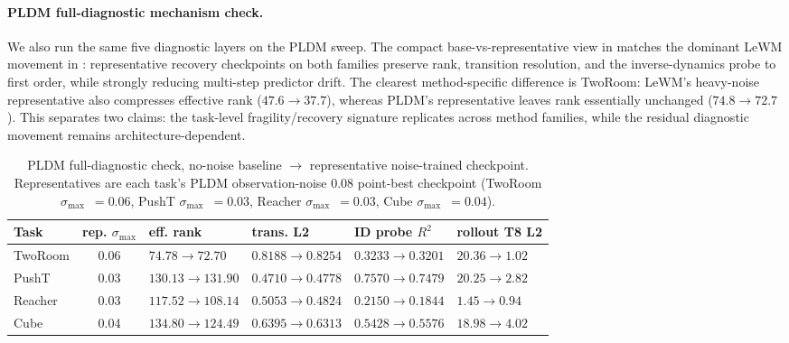 \documentclass[10pt]{article}
\newcommand{\stdmax}{\ensuremath{\sigma_{\max}}}
\begin{document}
\paragraph{PLDM full-diagnostic mechanism check.} We also run the same five diagnostic layers on the PLDM sweep. The compact base-vs-representative view in  matches the dominant LeWM movement in : representative recovery checkpoints on both families preserve rank, transition resolution, and the inverse-dynamics probe to first order, while strongly reducing multi-step predictor drift. The clearest method-specific difference is TwoRoom: LeWM's heavy-noise representative also compresses effective rank ($47.6 \to 37.7$), whereas PLDM's representative leaves rank essentially unchanged ($74.8 \to 72.7$). This separates two claims: the task-level fragility/recovery signature replicates across method families, while the residual diagnostic movement remains architecture-dependent.

\begin{table}[H]
\centering
\caption{PLDM full-diagnostic check, no-noise baseline $\to$ representative noise-trained checkpoint. Representatives are each task's PLDM observation-noise 0.08 point-best checkpoint (TwoRoom \stdmax{}~$= 0.06$, PushT \stdmax{}~$= 0.03$, Reacher \stdmax{}~$= 0.03$, Cube \stdmax{}~$= 0.04$).}
\label{tab:pldm-full-diag}
\small
\setlength{\tabcolsep}{4pt}
\begin{tabularx}{\textwidth}{l c >{\centering\arraybackslash}X >{\centering\arraybackslash}X >{\centering\arraybackslash}X >{\centering\arraybackslash}X}
\toprule
Task & rep. \stdmax{} & eff. rank & trans. L2 & ID probe $R^2$ & rollout T8 L2 \\
\midrule
TwoRoom & 0.06 & $74.78 \to 72.70$ & $0.8188 \to 0.8254$ & $0.3233 \to 0.3201$ & $20.36 \to 1.02$ \\
PushT   & 0.03 & $130.13 \to 131.90$ & $0.4710 \to 0.4778$ & $0.7570 \to 0.7479$ & $20.25 \to 2.82$ \\
Reacher & 0.03 & $117.52 \to 108.14$ & $0.5053 \to 0.4824$ & $0.2150 \to 0.1844$ & $1.45 \to 0.94$ \\
Cube    & 0.04 & $134.80 \to 124.49$ & $0.6395 \to 0.6313$ & $0.5428 \to 0.5576$ & $18.98 \to 4.02$ \\
\bottomrule
\end{tabularx}
\end{table}
\end{document}
